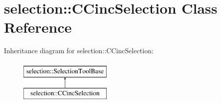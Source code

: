 \hypertarget{classselection_1_1CCincSelection}{}\section{selection\+:\+:C\+Cinc\+Selection Class Reference}
\label{classselection_1_1CCincSelection}
Inheritance diagram for selection\+:\+:C\+Cinc\+Selection\+:\begin{figure}[H]
\begin{center}
\leavevmode
\includegraphics[height=2.000000cm]{classselection_1_1CCincSelection}
\end{center}
\end{figure}
